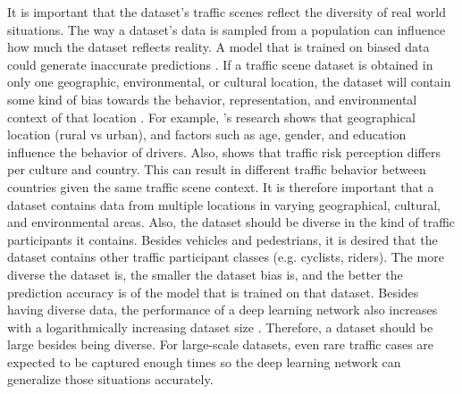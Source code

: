 It is important that the dataset's traffic scenes reflect the diversity of real world situations. The way a dataset's data is sampled from a population can influence how much the dataset reflects reality. A model that is trained on biased data could generate inaccurate predictions \cite{mehrabi2019survey}. If a traffic scene dataset is obtained in only one geographic, environmental, or cultural location, the dataset will contain some kind of bias towards the behavior, representation, and environmental context of that location \cite{mehrabi2019survey}. For example, \cite{nordfjaern2010investigation}'s research shows that geographical location (rural vs urban), and factors such as age, gender, and education influence the behavior of drivers. Also, \cite{nordfjaern2014culture} shows that traffic risk perception differs per culture and country. This can result in different traffic behavior between countries given the same traffic scene context. It is therefore important that a dataset contains data from multiple locations in varying geographical, cultural, and environmental areas. Also, the dataset should be diverse in the kind of traffic participants it contains. Besides vehicles and pedestrians, it is desired that the dataset contains other traffic participant classes (e.g. cyclists, riders). The more diverse the dataset is, the smaller the dataset bias is, and the better the prediction accuracy is of the model that is trained on that dataset. Besides having diverse data, the performance of a deep learning network also increases with a logarithmically increasing dataset size \cite{torralba2011unbiased}. Therefore, a dataset should be large besides being diverse. For large-scale datasets, even rare traffic cases are expected to be captured enough times so the deep learning network can generalize those situations accurately. \\

